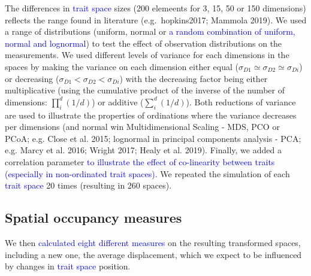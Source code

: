 \documentclass[]{article}
\begin{document}
The differences in \textcolor{blue}{trait space} sizes (200
elemeents for 3, 15, 50 or 150 dimensions) reflects the range found in
literature (e.g.~hopkins2017; Mammola 2019). We used a range of
distributions (uniform, normal or
\textcolor{blue}{a random combination of uniform, normal and lognormal})
to test the effect of observation distributions on the measurements. We
used different levels of variance for each dimensions in the spaces by
making the variance on each dimension either equal
(\(\sigma_{D1} \simeq \sigma_{D2} \simeq \sigma_{Di}\)) or decreasing
(\(\sigma_{D1} < \sigma_{D2} < \sigma_{Di}\)) with the decreasing factor
being either multiplicative (using the cumulative product of the inverse
of the number of dimensions: \(\prod_i^d(1/d)\)) or additive
(\(\sum_i^d(1/d)\)). Both reductions of variance are used to illustrate
the properties of ordinations where the variance decreases per
dimensions (and normal win Multidimensional Scaling - MDS, PCO or PCoA;
e.g. Close et al. 2015; lognormal in principal components analysis -
PCA; e.g. Marcy et al. 2016; Wright 2017; Healy et al. 2019). Finally,
we added a correlation parameter
\textcolor{blue}{to illustrate the effect of co-linearity between traits (especially in non-ordinated trait spaces).}
We repeated the simulation of each
\textcolor{blue}{trait space} 20 times (resulting in 260
spaces).

\subsection{Spatial occupancy
measures}\label{spatial-occupancy-measures}

We then
\textcolor{blue}{ calculated eight different measures } on
the resulting transformed spaces, including a new one, the average
displacement, which we expect to be influenced by changes in
\textcolor{blue}{trait space} position.

\renewcommand\baselinestretch{1}\selectfont
\end{document}
